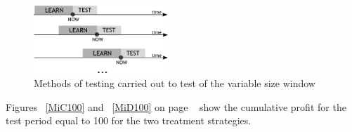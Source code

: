 \documentclass{tewiart}
\begin{document}
\begin{figure}[h!]
\begin{center}
\includegraphics[width=0.45\textwidth]{pictures/metodyka_badan.png}
\caption{Methods of testing carried out to test of the variable size window}
\label{research_methods}
\end{center}
\end{figure}
\FloatBarrier

Figures ~\ref{MiC100} and ~\ref{MiD100} on page ~\pageref{MiD100} show the cumulative profit for the test period equal to 100 for the two treatment strategies.
\end{document}
